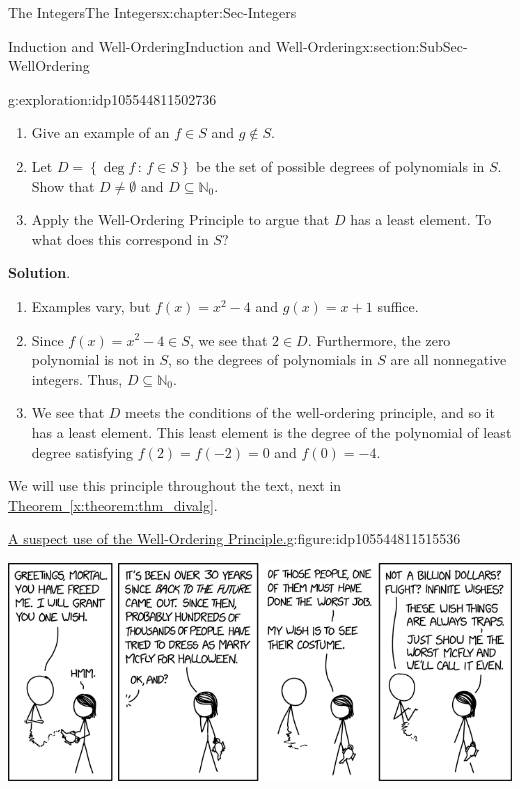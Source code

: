 \documentclass[oneside,10pt,]{book}
\newcommand{\blocktitlefont}{\relax}
\newcommand{\xreffont}{\relax}
\numberwithin{equation}{section}
\newcommand{\setof}[2]{{\left\{#1\,\colon\,#2\right\}}}
\def\N{{\mathbb N}}
\begin{document}
\begin{chapterptx}{The Integers}{}{The Integers}{}{}{x:chapter:Sec-Integers}
\begin{sectionptx}{Induction and Well-Ordering}{}{Induction and Well-Ordering}{}{}{x:section:SubSec-WellOrdering}
\begin{exploration}{}{g:exploration:idp105544811502736}
\begin{enumerate}
\item{}Give an example of an \(f\in S\) and \(g\notin S\).%
\item{}Let \(D = \setof{\deg f}{f\in S}\) be the set of possible degrees of polynomials in \(S\). Show that \(D\ne \emptyset\) and \(D\subseteq \N_0\).%
\item{}Apply the Well-Ordering Principle to argue that \(D\) has a least element. To what does this correspond in \(S\)?%
\end{enumerate}
\par\smallskip%
\noindent\textbf{\blocktitlefont Solution}.\hypertarget{g:solution:idp105544811510032}{}\quad{}%
\begin{enumerate}
\item{}Examples vary, but \(f(x) = x^2-4\) and \(g(x) = x+1\) suffice.%
\item{}Since \(f(x) = x^2 - 4\in S\), we see that \(2\in D\). Furthermore, the zero polynomial is not in \(S\), so the degrees of polynomials in \(S\) are all nonnegative integers. Thus, \(D\subseteq \N_0\).%
\item{}We see that \(D\) meets the conditions of the well-ordering principle, and so it has a least element. This least element is the degree of the polynomial of least degree satisfying \(f(2) = f(-2) = 0\) and \(f(0) = -4\).%
\end{enumerate}
\end{exploration}%
We will use this principle throughout the text, next in \hyperref[x:theorem:thm_divalg]{Theorem~{\xreffont\ref{x:theorem:thm_divalg}}}.%
\begin{figureptx}{\href{https://www.xkcd.com/2193/}{A suspect use of the Well-Ordering Principle.}\protect\footnotemark{}}{g:figure:idp105544811515536}{}%
\begin{image}{0.175}{0.65}{0.175}%
\includegraphics[width=\linewidth]{./images/well_ordering_principle.png}
\end{image}%
\tcblower
\end{figureptx}%

\end{sectionptx}
\end{chapterptx}
\end{document}
